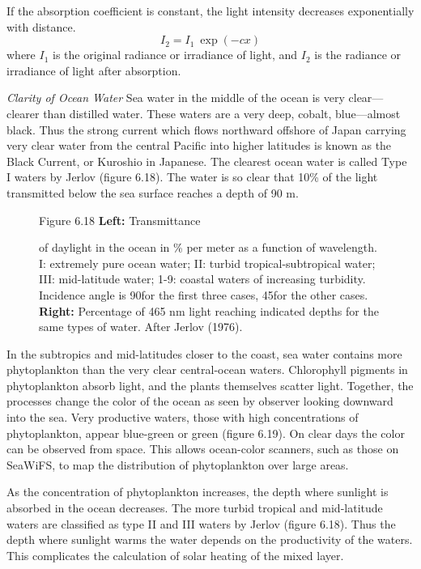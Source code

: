 If the absorption coefficient is constant, the light intensity
decreases exponentially with distance.
\begin{equation}
I_2 = I_1 \: \exp(-cx)
\end{equation}
where $I_1$ is the original radiance or irradiance of light, and $I_2$
is the radiance or irradiance of light after absorption.

\textit{Clarity of Ocean Water} Sea
water in the middle of the ocean is very clear---clearer than
distilled water. These waters are a very deep, cobalt, blue---almost
black. Thus the strong current which flows northward offshore of Japan
carrying very clear water from the central Pacific into higher
latitudes is known as the Black Current, or Kuroshio
in Japanese. The clearest ocean water is called Type I waters by
Jerlov (figure 6.18). The water is so clear that 10\% of the light
transmitted below the sea surface reaches a depth of 90 m.

\begin{figure}[t!]
\footnotesize
Figure 6.18 \textbf{Left:} Transmittance \rule{0mm}{3ex}of daylight in
the ocean in \% per meter as a function of wavelength. I: extremely
pure ocean water; II: turbid tropical-subtropical water; III:
mid-latitude water; 1-9: coastal waters of increasing
turbidity. Incidence angle is 90\degrees for the first three cases,
45\degrees for the other cases. \textbf{Right:} Percentage of 465 nm
light reaching indicated depths for the same types of water. After
Jerlov (1976).
\label{fig:jerlov}
\vspace{-3ex}
\end{figure}

In the subtropics and mid-latitudes closer to the coast, sea water
contains more phytoplankton than the very clear central-ocean
waters. Chlorophyll pigments in phytoplankton absorb light, and the
plants themselves scatter light. Together, the processes change the
color of the ocean as seen by observer looking downward into the
sea. Very productive waters, those with high concentrations of
phytoplankton, appear blue-green or green (figure 6.19). On clear days
the color can be observed from space. This allows ocean-color
scanners, such as those on SeaWiFS, to map the distribution of
phytoplankton over large areas.

As the concentration of phytoplankton increases, the depth where
sunlight is absorbed in the ocean decreases. The more turbid tropical
and mid-latitude waters are classified as type II and III waters by
Jerlov (figure 6.18). Thus the depth where sunlight warms the water
depends on the productivity of the waters. This complicates the
calculation of solar heating of the mixed layer.


